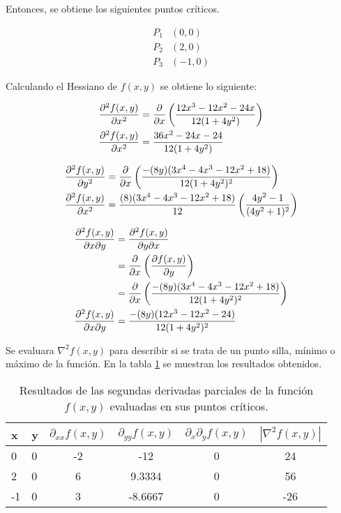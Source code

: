 Entonces, se obtiene los siguientes puntos críticos.

\begin{align*}
    P_1 & (0, 0)  \\
    P_2 & (2, 0)  \\
    P_3 & (-1, 0)
\end{align*}

Calculando el Hessiano de $f(x,y)$ se obtiene lo siguiente:

\begin{align*}
    \frac{\partial^2 f(x,y)}{\partial x^2} & =  \frac{\partial }{\partial x} \left ( \frac{12x^3-12x^2-24x}{12(1+4y^2)}\right ) \\
    \frac{\partial^2 f(x,y)}{\partial x^2} & = \frac{36x^2-24x-24}{12(1+4y^2)}
\end{align*}

\begin{align*}
    \frac{\partial^2 f(x,y)}{\partial y^2} & =  \frac{\partial }{\partial x} \left ( \frac{-(8y)(3x^4-4x^3-12x^2+18)}{12(1+4y^2)^2}\right ) \\
    \frac{\partial^2 f(x,y)}{\partial x^2} & = \frac{(8)(3x^4-4x^3-12x^2+18)}{12}\left (\frac{4y^2-1}{(4y^2+1)^2} \right )
\end{align*}

\begin{align*}
    \frac{\partial ^2 f(x,y)}{\partial x\partial y} & =  \frac{\partial ^2 f(x,y)}{\partial y\partial x}                                            \\
                                      & = \frac{\partial }{\partial x} \left (\frac{\partial f(x,y)}{\partial y} \right )                           \\
                                      & = \frac{\partial }{\partial x} \left ( \frac{-(8y)(3x^4-4x^3-12x^2+18)}{12(1+4y^2)^2}\right ) \\
    \frac{\partial ^2 f(x,y)}{\partial x\partial y} & = \frac{-(8y)(12x^3-12x^2-24)}{12(1+4y^2)^2}
\end{align*}

Se evaluara $\nabla^2f(x,y)$ para describir si se trata de un punto silla, mínimo o máximo de la función. En la tabla \ref{table:problema4} se muestran los resultados obtenidos.

\begin{table}[H]
    \centering
    \begin{tabular}{llcccc} \hline
        x  & y & $\partial_{xx} f(x,y)$ & $\partial_{yy} f(x,y)$ & $\partial_x\partial_y f(x,y)$ & $|\nabla^2 f(x,y)|$ \\ \hline
        0  & 0 & -2                     & -12                    & 0                             & 24                  \\
        2  & 0 & 6                      & 9.3334                 & 0                             & 56                  \\
        -1 & 0 & 3                      & -8.6667                & 0                             & -26                 \\ \hline
    \end{tabular}
    \caption{Resultados de las segundas derivadas parciales de la función $f(x,y)$ evaluadas en sus puntos críticos.}
    \label{table:problema4}
\end{table}


